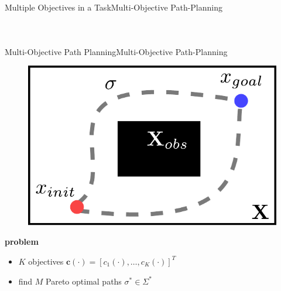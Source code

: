\begin{frame}{Multiple Objectives in a Task}{Multi-Objective Path-Planning}
\begin{columns}
\begin{figure}
	\end{figure}
\end{columns}

\end{frame}

\begin{frame}{Multi-Objective Path Planning}{Multi-Objective Path-Planning}
	
	\begin{figure}
		\centering
		\includegraphics[width=.5\linewidth]{figure/PathPlanning.pdf}
	\end{figure}
	
	\textbf{problem} \\
	\begin{itemize}
		\item \textcolor{reference_color}{$K$ objectives}  $ \bm{c}(\cdot) = [ c_{1} (\cdot), \ldots , c_{K}(\cdot) ]^{T}$ 
		\item find \textcolor{subproblem_color}{$ M $ Pareto optimal paths} $ \sigma^{*} \in \Sigma^{*}$    
	\end{itemize}                        
	
\end{frame}

